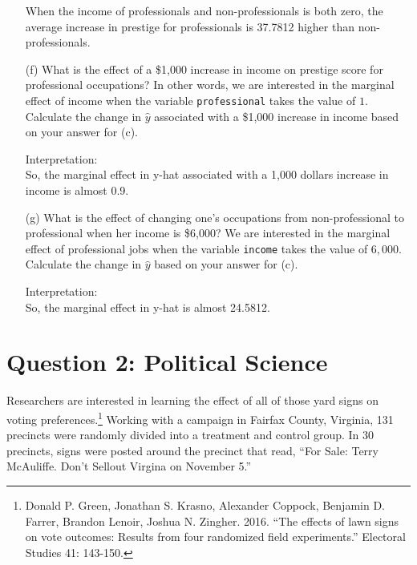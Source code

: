 \documentclass[12pt,letterpaper]{article}
\begin{document}
\begin{enumerate}
	When the income of professionals and non-professionals is both zero, the average increase in prestige for professionals is 37.7812 higher than non-professionals.
	\newpage
	\item [(f)]
	What is the effect of a \$1,000 increase in income on prestige score for professional occupations? In other words, we are interested in the marginal effect of income when the variable \texttt{professional} takes the value of $1$. Calculate the change in $\hat{y}$ associated with a \$1,000 increase in income based on your answer for (c).
	
	\vspace{1cm}
	
	\noindent
	Interpretation:\\
	So, the marginal effect in y-hat associated with a 1,000 dollars increase in income is almost 0.9.\\
	
	\item [(g)]
	What is the effect of changing one's occupations from non-professional to professional when her income is \$6,000? We are interested in the marginal effect of professional jobs when the variable \texttt{income} takes the value of $6,000$. Calculate the change in $\hat{y}$ based on your answer for (c).
	
	\vspace{1cm}
	
	\noindent
	Interpretation:\\
	So, the marginal effect in y-hat is almost 24.5812.
	
\end{enumerate}

\newpage

\section*{Question 2: Political Science}
\vspace{.25cm}
\noindent 	Researchers are interested in learning the effect of all of those yard signs on voting preferences.\footnote{Donald P. Green, Jonathan	S. Krasno, Alexander Coppock, Benjamin D. Farrer,	Brandon Lenoir, Joshua N. Zingher. 2016. ``The effects of lawn signs on vote outcomes: Results from four randomized field experiments.'' Electoral Studies 41: 143-150. } Working with a campaign in Fairfax County, Virginia, 131 precincts were randomly divided into a treatment and control group. In 30 precincts, signs were posted around the precinct that read, ``For Sale: Terry McAuliffe. Don't Sellout Virgina on November 5.'' \\
\end{document}
